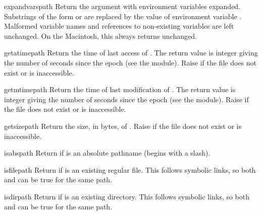 \begin{funcdesc}{expandvars}{path}
Return the argument with environment variables expanded.  Substrings
of the form  or  are
replaced by the value of environment variable .  Malformed
variable names and references to non-existing variables are left
unchanged.  On the Macintosh, this always returns 
unchanged.
\end{funcdesc}

\begin{funcdesc}{getatime}{path}
Return the time of last access of .  The return
value is integer giving the number of seconds since the epoch (see the 
 module).  Raise  if the file does
not exist or is inaccessible.
\end{funcdesc}

\begin{funcdesc}{getmtime}{path}
Return the time of last modification of .  The return
value is integer giving the number of seconds since the epoch (see the 
 module).  Raise  if the file does
not exist or is inaccessible.
\end{funcdesc}

\begin{funcdesc}{getsize}{path}
Return the size, in bytes, of .  Raise
 if the file does not exist or is inaccessible.
\end{funcdesc}

\begin{funcdesc}{isabs}{path}
Return  if  is an absolute pathname (begins with a
slash).
\end{funcdesc}

\begin{funcdesc}{isfile}{path}
Return  if  is an existing regular file.  This follows
symbolic links, so both  and 
can be true for the same path.
\end{funcdesc}

\begin{funcdesc}{isdir}{path}
Return  if  is an existing directory.  This follows
symbolic links, so both  and  can
be true for the same path.
\end{funcdesc}

